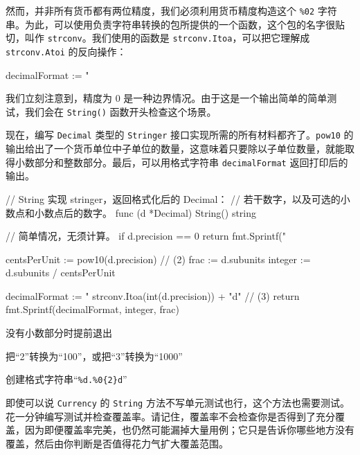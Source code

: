 然而，并非所有货币都有两位精度，我们必须利用货币精度构造这个 \texttt{\%02} 字符串。为此，可以使用负责字符串转换的包所提供的一个函数，这个包的名字很贴切，叫作 \texttt{strconv}。我们使用的函数是 \texttt{strconv.Itoa}，可以把它理解成 \texttt{strconv.Atoi} 的反向操作：

\begin{gocode}[]
decimalFormat := "%
\end{gocode}

我们立刻注意到，精度为 0 是一种边界情况。由于这是一个输出简单的简单测试，我们会在 \texttt{String()} 函数开头检查这个场景。

现在，编写 \texttt{Decimal} 类型的 \texttt{Stringer} 接口实现所需的所有材料都齐了。\texttt{pow10} 的输出给出了一个货币单位中子单位的数量，这意味着只要除以子单位数量，就能取得小数部分和整数部分。最后，可以用格式字符串 \texttt{decimalFormat} 返回打印后的输出。

\begin{gocode}[title={代码清单 6.30 \texttt{decimal.go}：实现 \texttt{Decimal} 的 \texttt{Stringer}}]
// String 实现 stringer，返回格式化后的 Decimal：
// 若干数字，以及可选的小数点和小数点后的数字。
func (d *Decimal) String() string {
    // 简单情况，无须计算。
    if d.precision == 0 {
        return fmt.Sprintf("%
    }

    centsPerUnit := pow10(d.precision) // (2)
    frac := d.subunits %
    integer := d.subunits / centsPerUnit

    decimalFormat := "%
        strconv.Itoa(int(d.precision)) + "d" // (3)
    return fmt.Sprintf(decimalFormat, integer, frac)

}
\end{gocode}

\begin{codeannotations}
\item 没有小数部分时提前退出
\item 把“2”转换为“100”，或把“3”转换为“1000”
\item 创建格式字符串“\texttt{\%d.\%0\{2\}d}”
\end{codeannotations}

即使可以说 \texttt{Currency} 的 \texttt{String} 方法不写单元测试也行，这个方法也需要测试。花一分钟编写测试并检查覆盖率。请记住，覆盖率不会检查你是否得到了充分覆盖，因为即便覆盖率完美，也仍然可能漏掉大量用例；它只是告诉你哪些地方没有覆盖，然后由你判断是否值得花力气扩大覆盖范围。

